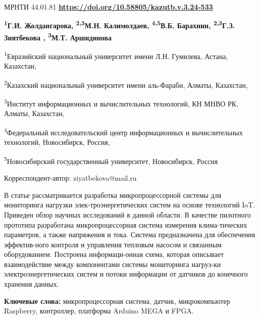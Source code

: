 \newpage
МРНТИ 44.01.81
\hfill {\bfseries \href{https://doi.org/10.58805/kazutb.v.3.24-533}{https://doi.org/10.58805/kazutb.v.3.24-533}}


\begin{center}
{\bfseries \textsuperscript{1}Г.И. Жолдангарова, \textsuperscript{2,3}М.Н.
Калимолдаев, \textsuperscript{4,5}В.Б. Барахнин,
\textsuperscript{2,3}Г.З. Зиятбекова \envelope, \textsuperscript{3}М.Т. Аршидинова}

\textsuperscript{1}Евразийский национальный университет имени Л.Н.
Гумилева, Астана, Казахстан,

\textsuperscript{2}Казахский национальный университет имени аль-Фараби,
Алматы, Казахстан,

\textsuperscript{3}Институт информационных и вычислительных технологий,
КН МНВО РК, Алматы, Казахстан,

\textsuperscript{4}Федеральный исследовательский центр информационных и
вычислительных технологий, Новосибирск, Россия,

\textsuperscript{5}Новосибирский государственный университет,
Новосибирск, Россия
\end{center}
\envelope Корреспондент-автор: ziyatbekova@mail.ru \vspace{0.5cm}

В статье рассматривается разработка микропроцессорной системы для
мониторинга нагрузки элек-троэнергетических систем на основе технологий
IoT. Приведен обзор научных исследований в данной области. В качестве
пилотного прототипа разработана микропроцессорная система измерения
клима-тических параметров, а также напряжения и тока. Система
предназначена для обеспечения эффектив-ного контроля и управления
тепловым насосом и связанным оборудованием. Построена информаци-онная
схема, которая описывает взаимодействие между компонентами системы
мониторинга нагруз-ки электроэнергетических систем и потоки информации от
датчиков до конечного хранения данных.

{\bfseries Ключевые слова:} микропроцессорная система, датчик,
микрокомпьютер Raspberry, контроллер, платформа Arduino MEGA и FPGA.



